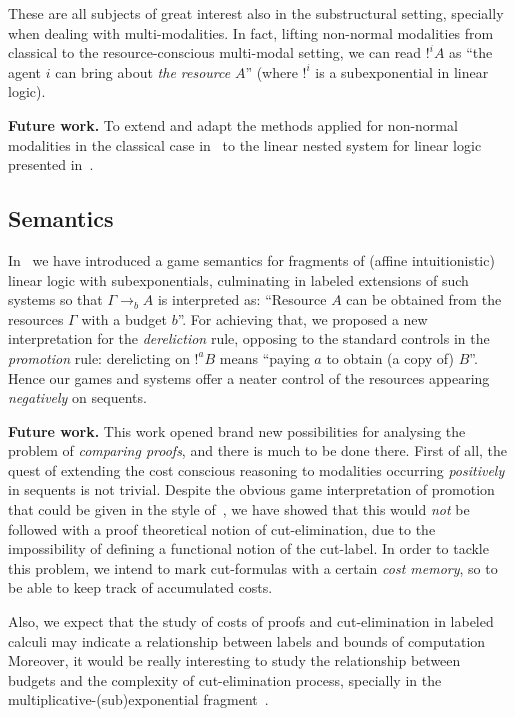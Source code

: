 \documentclass[11pt,a4paper]{article}
\begin{document}
These are all subjects of great interest also in the substructural setting, specially when dealing with multi-modalities. In fact, lifting non-normal modalities from classical  to the resource-conscious multi-modal setting, we can read $!^{i} A$ as ``the agent $i$ can bring about {\em the resource} $A$'' (where $!^{i}$ is a subexponential in linear logic).

{\bf Future work.} To extend and adapt the methods applied for non-normal modalities in the classical case in~\cite{DBLP:journals/tocl/LellmannP19} to the linear nested system for linear logic presented in~\cite{DBLP:conf/lpar/LellmannOP17}. 


\subsection{Semantics} 
In~\cite{DBLP:conf/tableaux/LangOPF19} we have introduced a game semantics for fragments of (affine intuitionistic) linear logic with subexponentials, culminating in labeled extensions of such systems so that
$\Gamma \longrightarrow_{b} A$ is interpreted as: ``Resource $A$ can be obtained from the resources $\Gamma$ with a budget $b$''.  For achieving that, we proposed a new interpretation for the {\em dereliction} rule, opposing to the standard controls in the {\em promotion} rule:  derelicting on $!^aB$ means ``paying $a$ to obtain (a copy of) $B$''. Hence our games and systems offer a neater  control of the resources appearing {\em negatively} on sequents. 

{\bf Future work.} 
This work opened brand new possibilities for analysing the problem of {\em comparing proofs}, and there is much to be done there. First of all,  the quest of extending the cost conscious reasoning to modalities occurring {\em positively} in sequents is not trivial. Despite the obvious game interpretation of promotion that could be given in the style of~\cite{DBLP:conf/tableaux/FermullerL17}, we have showed that this would {\em not} be followed with a proof theoretical notion of cut-elimination, due to the impossibility of defining a functional notion of the cut-label. In order to tackle this problem, we intend to mark cut-formulas with a certain {\em cost memory}, so to be able to keep track of accumulated costs.

Also, we expect that the study of costs of proofs and cut-elimination in labeled calculi may indicate a relationship between labels and bounds of computation~\cite{DBLP:journals/jfp/AccattoliGK20} 
%
Moreover, it would be really interesting to study the relationship between budgets and the complexity of cut-elimination process, specially in the multiplicative-(sub)exponential fragment~\cite{DBLP:journals/tcs/Strassburger03,DBLP:journals/tocl/StrassburgerG11}.
\end{document}
